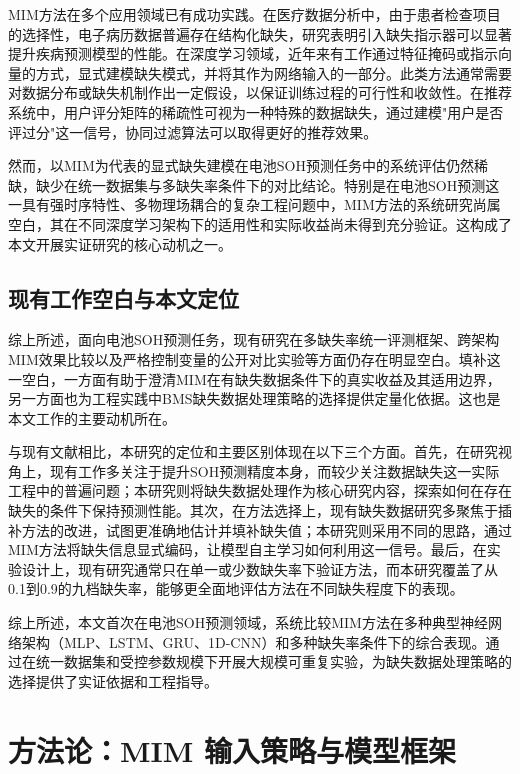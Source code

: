 \documentclass[10pt,a4paper]{ctexart}
\begin{document}
MIM方法在多个应用领域已有成功实践。在医疗数据分析中，由于患者检查项目的选择性，电子病历数据普遍存在结构化缺失，研究表明引入缺失指示器可以显著提升疾病预测模型的性能\cite{sisk2023imputation,ehrig2025imputation}。在深度学习领域，近年来有工作通过特征掩码或指示向量的方式，显式建模缺失模式，并将其作为网络输入的一部分\cite{ipsen2022deal,che2018recurrent}。此类方法通常需要对数据分布或缺失机制作出一定假设，以保证训练过程的可行性和收敛性。在推荐系统中，用户评分矩阵的稀疏性可视为一种特殊的数据缺失，通过建模"用户是否评过分"这一信号，协同过滤算法可以取得更好的推荐效果。

然而，以MIM为代表的显式缺失建模在电池SOH预测任务中的系统评估仍然稀缺，缺少在统一数据集与多缺失率条件下的对比结论。特别是在电池SOH预测这一具有强时序特性、多物理场耦合的复杂工程问题中，MIM方法的系统研究尚属空白，其在不同深度学习架构下的适用性和实际收益尚未得到充分验证。这构成了本文开展实证研究的核心动机之一。

\subsection{现有工作空白与本文定位}

综上所述，面向电池SOH预测任务，现有研究在多缺失率统一评测框架、跨架构MIM效果比较以及严格控制变量的公开对比实验等方面仍存在明显空白。填补这一空白，一方面有助于澄清MIM在有缺失数据条件下的真实收益及其适用边界，另一方面也为工程实践中BMS缺失数据处理策略的选择提供定量化依据。这也是本文工作的主要动机所在。

与现有文献相比，本研究的定位和主要区别体现在以下三个方面。首先，在研究视角上，现有工作多关注于提升SOH预测精度本身，而较少关注数据缺失这一实际工程中的普遍问题；本研究则将缺失数据处理作为核心研究内容，探索如何在存在缺失的条件下保持预测性能。其次，在方法选择上，现有缺失数据研究多聚焦于插补方法的改进，试图更准确地估计并填补缺失值；本研究则采用不同的思路，通过MIM方法将缺失信息显式编码，让模型自主学习如何利用这一信号。最后，在实验设计上，现有研究通常只在单一或少数缺失率下验证方法，而本研究覆盖了从0.1到0.9的九档缺失率，能够更全面地评估方法在不同缺失程度下的表现。

综上所述，本文首次在电池SOH预测领域，系统比较MIM方法在多种典型神经网络架构（MLP、LSTM、GRU、1D-CNN）和多种缺失率条件下的综合表现。通过在统一数据集和受控参数规模下开展大规模可重复实验，为缺失数据处理策略的选择提供了实证依据和工程指导。

\section{方法论：MIM 输入策略与模型框架}\label{sec:method}
\end{document}
